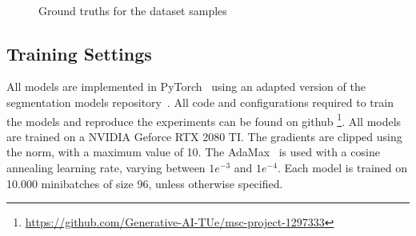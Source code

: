 \begin{figure}
    \centering
    \\
    \caption{\label{fig:coco-samples}Ground truths for the dataset samples}
\end{figure}


\subsection{Training Settings}
All models are implemented in PyTorch~\cite{Ansel_PyTorch_2_Faster_2024} using an adapted version of the segmentation models repository~\cite{Iakubovskii:2019}. All code and configurations required to train the models and reproduce the experiments can be found on github \footnote[1]{\url{https://github.com/Generative-AI-TUe/msc-project-1297333}}. All models are trained on a NVIDIA Geforce RTX 2080 TI. The gradients are clipped using the norm, with a maximum value of 10. The AdaMax~\cite{kingma2017adammethodstochasticoptimization} is used with a cosine annealing learning rate, varying between $1e^{-3}$ and $1e^{-4}$. Each model is trained on 10.000 minibatches of size 96, unless otherwise specified.





